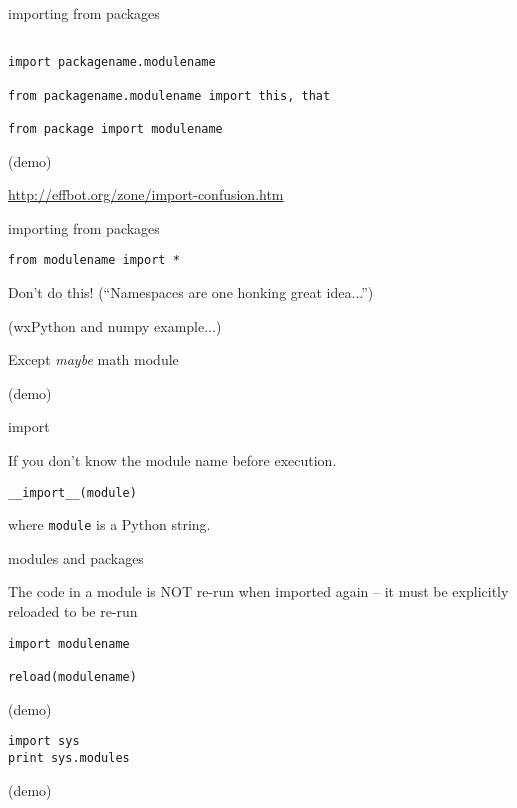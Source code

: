 \documentclass{beamer}
\begin{document}
\begin{frame}[fragile]{importing from packages}

\begin{verbatim}

import packagename.modulename

from packagename.modulename import this, that

from package import modulename

\end{verbatim}
\vfill
(demo)

\vfill
\url{http://effbot.org/zone/import-confusion.htm}

\end{frame} 

\begin{frame}[fragile]{importing from packages}

\begin{verbatim}
from modulename import *
\end{verbatim}

\vfill
{\LARGE Don't do this!}
\vfill
{\Large (``Namespaces are one honking great idea...'')}

\vfill
(wxPython and numpy example...)

\vfill
Except \emph{maybe} math module

\vfill
(demo)
\end{frame} 


\begin{frame}[fragile]{import}

\vfill
If you don’t know the module name before execution.

\vfill
\begin{verbatim}
__import__(module)
\end{verbatim}

\vfill
where \verb|module| is a Python string.

\vfill
\end{frame}

\begin{frame}[fragile]{modules and packages}

\vfill
{\Large The code in a module is NOT re-run when imported again
 -- it must be explicitly reloaded to be re-run}

\begin{verbatim}
import modulename

reload(modulename)
\end{verbatim}

(demo)

\begin{verbatim}
import sys
print sys.modules
\end{verbatim}
(demo)
\end{frame}
\end{document}
